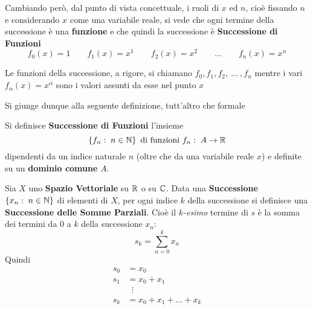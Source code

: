 Cambiando però, dal punto di vista concettuale, i ruoli di $x$ ed $n$, cioè fissando $n$ e considerando $x$ come una variabile reale, si vede che ogni termine della successione è una \textbf{funzione} e che quindi la successione è \textbf{Successione di Funzioni}
\[f_0(x) = 1 \qquad f_1(x) = x^1 \qquad f_2(x) = x^2  \qquad \dots \qquad f_n(x) = x^n\]
\vspace*{-\baselineskip}
\begin{note}
	Le funzioni della successione, a rigore, si chiamano $f_0, f_1, f_2 ,\:\dotsc\:, f_n$ mentre i vari $f_\alpha(x) = x^\alpha$ sono i valori assunti da esse nel punto $x$
\end{note}
Si giunge dunque alla seguente definizione, tutt'altro che formale
\begin{definition}
	\label{def:succ_funz}
	Si definisce \textbf{Successione di Funzioni} l'insieme
	\[\left\{f_n:\; n \in \mathbb{N}\right\} \text{ di funzioni } f_n:\; A \to \mathbb{R}\]
	dipendenti da un indice naturale $n$ (oltre che da una variabile reale $x$) e definite su un \textbf{dominio comune} $A$.
\end{definition}

\begin{definition}
	\label{def:succ_somm_parz}
	Sia $X$ uno \textbf{Spazio Vettoriale} su $\mathbb{R}$ o su $\mathbb{C}$. Data una \textbf{Successione} $\left\{x_n:\; n \in \mathbb{N}\right\}$ di elementi di $X$, per ogni indice $k$ della successione si definisce una \textbf{Successione delle Somme Parziali}. Cioè il $k$\textit{-esimo} termine di $s$ è la somma dei termini da $0$ a $k$ della successione $x_n$:
	\[s_k = \sum\limits_{n = 0}^{k} x_n\]
	Quindi
	\begin{align*}
		s_0 &= x_0\\
		s_1 &= x_0 + x_1\\
		&\;\;\vdots\\
		s_k &= x_0 + x_1 + \dots + x_k
	\end{align*}
\end{definition}

